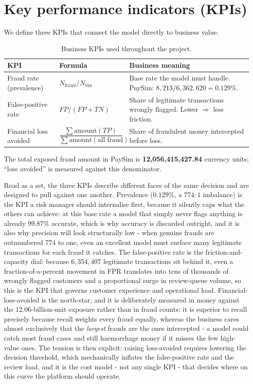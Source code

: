 \documentclass[11pt,a4paper]{report}
\begin{document}
\section{Key performance indicators (KPIs)}

We define three KPIs that connect the model directly to business value.

\begin{table}[h]
\centering
\small
\begin{tabularx}{\textwidth}{@{}l l Y@{}}
\toprule
\textbf{KPI} & \textbf{Formula} & \textbf{Business meaning}\\
\midrule
Fraud rate (prevalence) & $N_{\text{fraud}} / N_{\text{txn}}$ &
Base rate the model must handle. PaySim: $8{,}213 / 6{,}362{,}620 = 0.129\%$.\\
\addlinespace
False-positive rate & $FP / (FP+TN)$ &
Share of legitimate transactions wrongly flagged. Lower $\Rightarrow$ less friction.\\
\addlinespace
Financial loss avoided & $\dfrac{\sum \text{amount}(TP)}{\sum \text{amount}(\text{all fraud})}$ &
Share of fraudulent money intercepted before loss.\\
\bottomrule
\end{tabularx}
\caption{Business KPIs used throughout the project.}
\label{tab:kpi}
\end{table}

\noindent The total exposed fraud amount in PaySim is \textbf{12{,}056{,}415{,}427.84}
currency units; ``loss avoided'' is measured against this denominator.

Read as a set, the three KPIs describe different faces of the same decision and are designed to pull against one another. Prevalence ($0.129\%$, a $774{:}1$ imbalance) is the KPI a risk manager should internalise first, because it silently caps what the others can achieve: at this base rate a model that simply never flags anything is already $99.87\%$ accurate, which is why accuracy is discarded outright, and it is also why precision will look structurally low - when genuine frauds are outnumbered $774$ to one, even an excellent model must surface many legitimate transactions for each fraud it catches. The false-positive rate is the friction-and-capacity dial: because $6{,}354{,}407$ legitimate transactions sit behind it, even a fraction-of-a-percent movement in FPR translates into tens of thousands of wrongly flagged customers and a proportional surge in review-queue volume, so this is the KPI that governs customer experience and operational load. Financial-loss-avoided is the north-star, and it is deliberately measured in money against the $12.06$-billion-unit exposure rather than in fraud counts: it is superior to recall precisely because recall weights every fraud equally, whereas the business cares almost exclusively that the \emph{largest} frauds are the ones intercepted - a model could catch most fraud cases and still haemorrhage money if it misses the few high-value ones. The tension is then explicit: raising loss-avoided requires lowering the decision threshold, which mechanically inflates the false-positive rate and the review load, and it is the cost model - not any single KPI - that decides where on this curve the platform should operate.
\end{document}
